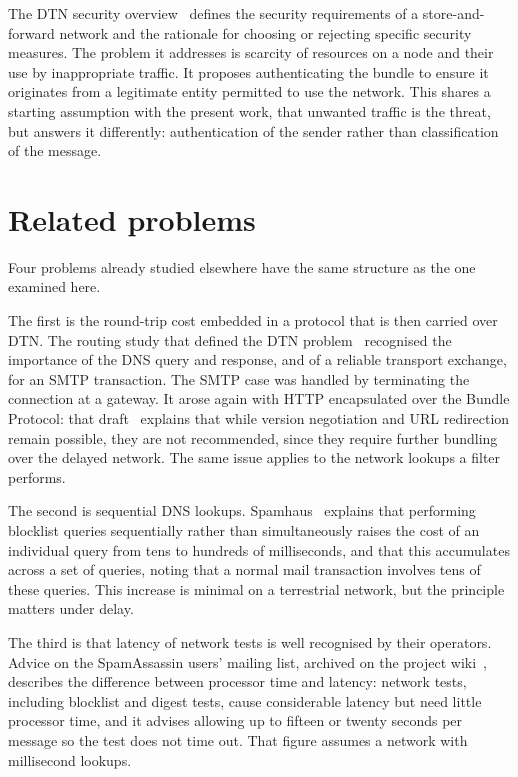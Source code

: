 The DTN security overview~\cite{irtf-dtnrg-sec-overview-06} defines the security requirements of a store-and-forward network and the rationale for choosing or rejecting specific security measures. The problem it addresses is scarcity of resources on a node and their use by inappropriate traffic. It proposes authenticating the bundle to ensure it originates from a legitimate entity permitted to use the network. This shares a starting assumption with the present work, that unwanted traffic is the threat, but answers it differently: authentication of the sender rather than classification of the message.

\section{Related problems}

Four problems already studied elsewhere have the same structure as the one examined
here.

The first is the round-trip cost embedded in a protocol that is then carried over DTN. The routing study that defined the DTN problem~\cite{jain-dtn-routing} recognised the importance of the DNS query and response, and of a reliable transport exchange, for an SMTP transaction. The SMTP case was handled by terminating the connection at a gateway.
It arose again with HTTP encapsulated over the Bundle Protocol: that draft~\cite{blanchet-dtn-http-over-bp-04} explains that while version negotiation and URL redirection remain possible, they are not recommended, since they require further bundling over the delayed network. The same issue applies to the network lookups a filter performs.

The second is sequential DNS lookups. Spamhaus~\cite{spamhaus-qname} explains that performing blocklist queries sequentially rather than simultaneously raises the cost of an individual query from tens to hundreds of milliseconds, and that this accumulates across a set of queries, noting that a normal mail transaction involves tens of these queries. This increase is minimal on a terrestrial network, but the principle matters under delay.

The third is that latency of network tests is well recognised by their operators. Advice on the SpamAssassin users' mailing list, archived on the project wiki~\cite{sa-netlatency}, describes the difference between processor time and latency: network tests, including blocklist and digest tests, cause considerable latency but need little processor time, and it advises allowing up to fifteen or twenty seconds per message so the test does not time out. That figure assumes a network with millisecond lookups.

